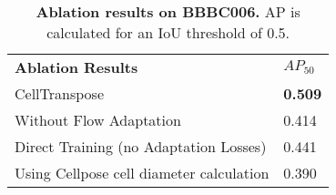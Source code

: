 \begin{table}
\begin{center}
\caption{\textbf{Ablation results on BBBC006.} AP is calculated for an IoU threshold of 0.5.}
\label{table:ablation}
\begin{tabular}{l|l}
\hline\noalign{\smallskip}
{\bf Ablation Results} & $AP_{50}$\\
\noalign{\smallskip}
\hline
\noalign{\smallskip}
CellTranspose & \textbf{0.509}\\
Without Flow Adaptation & 0.414\\
Direct Training (no Adaptation Losses) & 0.441\\
Using Cellpose cell diameter calculation & 0.390\\
\hline
\end{tabular}
\end{center}
\vspace{-5mm}
\end{table}

